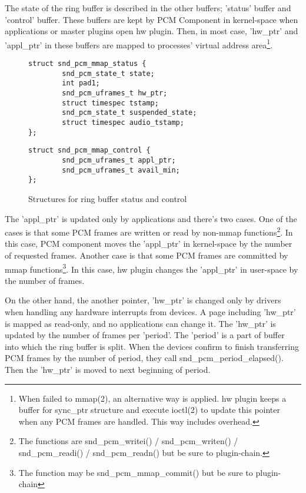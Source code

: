 \documentclass[onecolumn]{article}
\begin{document}
The state of the ring buffer is described in the other buffers; 'status' buffer and 'control' buffer. These buffers are kept by PCM Component in kernel-space when applications or master plugins open hw plugin. Then, in most case, 'hw\_ptr' and 'appl\_ptr' in these buffers are mapped to processes' virtual address area\footnote{When failed to mmap(2), an alternative way is applied. hw plugin keeps a buffer for sync\_ptr structure and execute ioctl(2) to update this pointer when any PCM frames are handled. This way includes overhead.}.

\begin{figure}
\small
\begin{verbatim}
struct snd_pcm_mmap_status {
        snd_pcm_state_t state;
        int pad1;
        snd_pcm_uframes_t hw_ptr;
        struct timespec tstamp;
        snd_pcm_state_t suspended_state;
        struct timespec audio_tstamp;
};
\end{verbatim}
\begin{verbatim}
struct snd_pcm_mmap_control {
        snd_pcm_uframes_t appl_ptr;
        snd_pcm_uframes_t avail_min;
};
\end{verbatim}
\caption{{Structures for ring buffer status and control}}
\label{pcm-mmap-status-control}
\end{figure}

The 'appl\_ptr' is updated only by applications and there's two cases. One of the cases is that some PCM frames are written or read by non-mmap functions\footnote{The functions are snd\_pcm\_writei() / snd\_pcm\_writen() / snd\_pcm\_readi() / snd\_pcm\_readn() but be sure to plugin-chain.}. In this case, PCM component moves the 'appl\_ptr' in kernel-space by the number of requested frames. Another case is that some PCM frames are committed by mmap functions\footnote{The function may be snd\_pcm\_mmap\_commit() but be sure to plugin-chain}. In this case, hw plugin changes the 'appl\_ptr' in user-space by the number of frames.

On the other hand, the another pointer, 'hw\_ptr' is changed only by drivers when handling any hardware interrupts from devices. A page including 'hw\_ptr' is mapped as read-only, and no applications can change it. The 'hw\_ptr' is updated by the number of frames per 'period'. The 'period' is a part of buffer into which the ring buffer is split. When the devices confirm to finish transferring PCM frames by the number of period, they call snd\_pcm\_period\_elapsed(). Then the 'hw\_ptr' is moved to next beginning of period.
\end{document}
